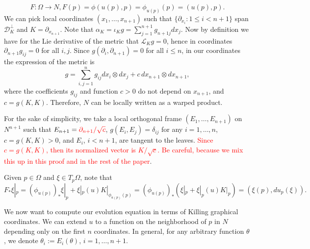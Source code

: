 \documentclass[12pt]{article}
\numberwithin{lemma}{section}
\begin{document}
\[F:\Omega\rightarrow N, F(p)=\phi(u(p),p)=\phi_{u(p)}(p)=(u(p),p).\]
We can pick local coordinates $(x_1,\dots, x_{n+1})$ such that $\{\partial_{x_i}: 1\leq i<n+1\}$ span $\mathcal{D}^{\perp}_K$ and $K=\partial_{x_{n+1}}$. Note that $\alpha_K=\iota_Kg=\sum_{j=1}^{n+1} g_{n+1j}dx_j$. Now by definition we have for the Lie derivative of the metric that $\mathcal{L}_Kg=0$, hence in coordinates $\partial_{n+1}g_{ij}=0$ for all $i,j$. Since $g(\partial_i, \partial_{n+1}) = 0$ for all $i \leq n$,  in our coordinates the expression of the metric is
\[g=\sum_{i,j=1}^{n}g_{ij}dx_i\otimes dx_j + c\, dx_{n+1} \otimes dx_{n+1}  ,\]
where the coefficients $g_{ij}$ and function $c>0$ do not depend on $x_{n+1}$, and $c= g(K,K)$.
Therefore, $N$  can be locally written as a warped product.

For the sake of simplicity, we take a local orthogonal frame $(E_1,\ldots,E_{n+1})$ on $N^{n+1}$ such that $E_{n+1}=\color{red}{\partial_{n+1}/\sqrt{c}}$, $g(E_i,E_j)=\delta_{ij}$ for any $i=1,\ldots,n$, $c=g(K,K)>0$, and $E_i$, $i<n+1$, are tangent to the leaves. \textcolor{red}{Since $c=g(K,K)$, then its normalized vector is $K/\sqrt{c}$. Be careful, because we mix this up in this proof and in the rest of the paper}. 




Given $p\in\Omega$ and $\xi\in T_p\Omega$, note that 
\[F_* \xi|_p = (\phi_{u(p)})_* \xi|_p + \xi|_p(u) K|_{\phi_{u(p)}(p)} = (\phi_{u(p)})_* (\xi|_p + \xi|_p(u)K|_p)
=(\xi(p),du_p(\xi)).
\]

We now want to compute our evolution equation in terms of Killing graphical coordinates. 
We can extend $u$ to a function on the neighborhood of $p$ in $N$ depending only on the first $n$ coordinates. In general, for any arbitrary function $\theta$, we denote $\theta_i:=E_i(\theta)$, $i=1,\ldots,n+1$. 
\end{document}
